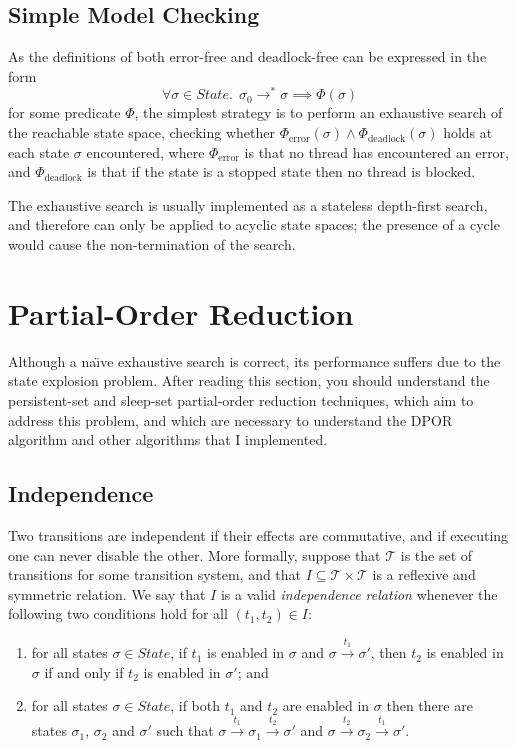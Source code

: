 \documentclass[12pt,a4paper,twoside,openright]{report}
\begin{document}
\subsection{Simple Model Checking}
\label{sec:simple-prep}
As the definitions of both error-free and deadlock-free
can be expressed in the form
\[
	\forall \sigma \in \textit{State}.\;\, \sigma_0 \longrightarrow^* \sigma
	\implies \Phi (\sigma)
\]
for some predicate $\Phi$, the simplest strategy is to
perform an exhaustive search of the reachable state space,
checking whether $\Phi_\text{error}(\sigma) \wedge
\Phi_\text{deadlock}(\sigma)$
holds at each state $\sigma$ encountered,
where $\Phi_\text{error}$ is that
no thread has encountered an error, and $\Phi_\text{deadlock}$ is
that if the state is a stopped state then no
thread is blocked.

The exhaustive search is usually
implemented as a stateless depth-first search,
and therefore can only be applied to acyclic state spaces;
the presence of a cycle would cause the non-termination
of the search.

\section{Partial-Order Reduction}

Although a na\"{\i}ve exhaustive search
is correct, its performance suffers due to
the state explosion problem.
After reading this section, you should
understand the persistent-set and sleep-set
partial-order reduction techniques, which
aim to address this problem, and which
are necessary to understand the DPOR
algorithm and other algorithms that I
implemented.

\subsection{Independence} \label{sec:independence}
Two transitions are independent if their
effects are commutative, and if executing one
can never disable the other.
More formally, suppose that $\mathcal{T}$ is the set of
transitions for some transition system, and
that $I \subseteq \mathcal{T} \times \mathcal{T}$
is a reflexive and symmetric relation. We say
that $I$ is a valid \emph{independence relation}
whenever the following two conditions hold for
all $(t_1, t_2) \in I$:
\begin{enumerate}
	\item for all states $\sigma \in \textit{State}$,
		if $t_1$ is enabled in $\sigma$ and
		$\sigma \xrightarrow{t_1} \sigma'$, then
		$t_2$ is enabled in $\sigma$ if and only if
		$t_2$ is enabled in $\sigma'$; and
	\item for all states $\sigma \in \textit{State}$,
		if both $t_1$ and $t_2$ are enabled in $\sigma$
		then there are states $\sigma_1$, $\sigma_2$ and
		$\sigma'$ such that
		$\sigma \xrightarrow{t_1} \sigma_1 \xrightarrow{t_2} \sigma'$
		and
		$\sigma \xrightarrow{t_2} \sigma_2 \xrightarrow{t_1} \sigma'$.
\end{enumerate}
\end{document}
